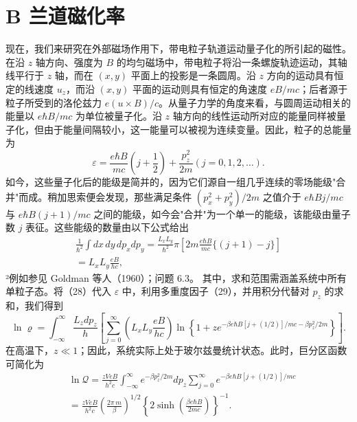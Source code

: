 \section{B 兰道磁化率}\label{b-ux5170ux9053ux78c1ux5316ux7387}
现在，我们来研究在外部磁场作用下，带电粒子轨道运动量子化的所引起的磁性。在沿 \(z\) 轴方向、强度为 \(B\) 的均匀磁场中，带电粒子将沿一条螺旋轨迹运动，其轴线平行于 \(z\) 轴，而在 \((x,y)\) 平面上的投影是一条圆周。沿 \(z\) 方向的运动具有恒定的线速度 \(u_z\)，而沿 \((x,y)\) 平面的运动则具有恒定的角速度 \(eB/mc\)；后者源于粒子所受到的洛伦兹力 \(e(u \times B)/c\)。从量子力学的角度来看，与圆周运动相关的能量以 \(e\hbar B/mc\) 为单位被量子化。沿 \(z\) 轴方向的线性运动所对应的能量同样被量子化，但由于能量间隔较小，这一能量可以被视为连续变量。因此，粒子的总能量为
\begin{equation}\tag{8.2.1}\label{eq:8.2.1}
\varepsilon = \frac { e \hbar B } { m c } \left( j + \frac { 1 } { 2 } \right) + \frac { p _ { z } ^{2} } { 2 m }  ( j = 0 , 1 , 2 , \ldots ) .
\end{equation}
如今，这些量子化后的能级是简并的，因为它们源自一组几乎连续的零场能级"合并"而成。稍加思索便会发现，那些满足条件 \((p_{x}^{2}+p_{y}^{2})/2m\) 之值介于 \(e\hbar Bj/mc\) 与 \(e\hbar B(j+1)/mc\) 之间的能级，如今会"合并"为一个单一的能级，该能级由量子数 \(j\) 表征。这些能级的数量由以下公式给出
\begin{equation}\tag{8.2.2}\label{eq:8.2.2}
\begin{array}{r} { \frac { 1 } { \hbar ^{2} } \int d x \, d y \, d p _ { x } d p _ { y } = \frac { L _ { x } L _ { y } } { \hbar ^{2} } \pi \left[ 2 m \frac { e \hbar B } { m c } \{ ( j + 1 ) - j \} \right] } \\{ = L _ { x } L _ { y } \frac { e B } { h c } , } \end{array}
\end{equation}
²例如参见 Goldman 等人（1960）；问题 6.3。
其中，求和范围需涵盖系统中所有单粒子态。将（28）代入 \(\varepsilon\) 中，利用多重度因子（29），并用积分代替对 \(p_z\) 的求和，我们得到
\begin{equation}\tag{8.2.3}\label{eq:8.2.3}
\ln \varrho = \int _ { - \infty } ^{\infty} \frac { L _ { z } d p _ { z } } { h } \left[ \sum _ { j = 0 } ^{\infty} \left( L _ { x } L _ { y } \frac { e B } { h c } \right) \ln \left\{ 1 + z e ^{- \beta e \hbar B [ j + ( 1 / 2 ) ] / m c - \beta p _ { z} ^{2} / 2 m } \right\} \right] .
\end{equation}
在高温下，\(z \ll 1\)；因此，系统实际上处于玻尔兹曼统计状态。此时，巨分区函数可简化为
\begin{equation}\tag{8.2.4}\label{eq:8.2.4}
\begin{array}{rl} & { \ln \mathcal { Q } = \frac { z V e B } { h ^{2} c } \int _ { - \infty } ^{\infty} e ^{- \beta p _ { z} ^{2} / 2 m } d p _ { z } \sum _ { j = 0 } ^{\infty} e ^{- \beta e \hbar B [ j + ( 1 / 2 ) ] / m c} } \\& {  = \frac { z V e B } { h ^{2} c } \left( \frac { 2 \pi \, m } { \beta } \right) ^{1 / 2} \left\{ 2 \sinh \left( \frac { \beta e \hbar B } { 2 m c } \right) \right\} ^{- 1} . } \end{array}
\end{equation}
